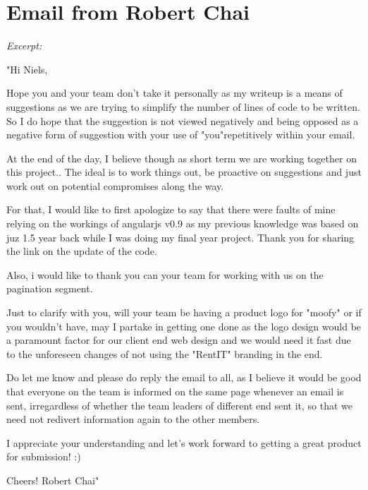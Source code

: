 \section{Email from Robert Chai}
\label{app:robertsletter}
\emph{Excerpt:}

"Hi Niels,

Hope you and your team don't take it personally as my writeup is a means of
suggestions as we are trying to simplify the number of lines of code to be
written. So I do hope that the suggestion is not viewed negatively and being
opposed as a negative form of suggestion with your use of "you"repetitively
within your email.

At the end of the day, I believe though as short term we are working together
on this project.. The ideal is to work things out, be proactive on suggestions
and just work out on potential compromises along the way.

For that, I would like to first apologize to say that there were faults of mine
relying on the workings of angularjs v0.9 as my previous knowledge was based on
juz 1.5 year back while I was doing my final year project. Thank you for
sharing the link on the update of the code.

Also, i would like to thank you can your team for working with us on the
pagination segment.

Just to clarify with you, will your team be having a product logo for "moofy" or if you wouldn't have, may I partake in getting one done as the logo design would be a paramount factor for our client end web design and we would need it fast due to the unforeseen changes of not using the "RentIT" branding in the end.

Do let me know and please do reply the email to all, as I believe it would be good that everyone on the team is informed on the same page whenever an email is sent, irregardless of whether the team leaders of different end sent it, so that we need not redivert information again to the other members.

I appreciate your understanding and let's work forward to getting a great product for submission! :)

Cheers! 
Robert Chai"
